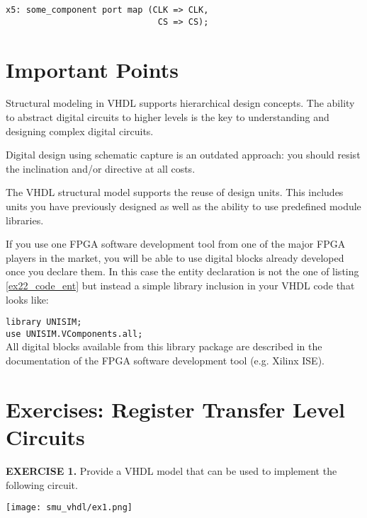 \begin{lstlisting}[label=ex22_code_same_sig, caption=An example of the same signal name crossing hierarchical boundaries.]
x5: some_component port map (CLK => CLK,
                              CS => CS); 
\end{lstlisting}

\section{Important Points}
\begin{my_list}
\item Structural modeling in VHDL supports hierarchical design concepts. The ability to abstract digital circuits to higher levels is the key to understanding and designing complex digital circuits.

\item Digital design using schematic capture is an outdated approach: you should resist the inclination and/or directive at all costs.

\item The VHDL structural model supports the reuse of design units. This includes units you have previously designed as well as the ability to use predefined module libraries.

\item If you use one FPGA software development tool from one of the major FPGA players in the market, you will be able to use digital blocks already developed once you declare them. In this case the entity declaration is not the one of listing \ref{ex22_code_ent} but instead a simple library inclusion in your VHDL code that looks like:

\hspace*{50pt}
\texttt{library UNISIM;}\\
\hspace*{50pt}
\texttt{use UNISIM.VComponents.all;}\\
All digital blocks available from this library package are described in the documentation of the FPGA software development tool (e.g. Xilinx ISE).
\end{my_list}

\section{Exercises: Register Transfer Level Circuits}

\vspace{20pt}
\noindent
\begin{minipage}[t]{0.5\textwidth}
\textbf{EXERCISE 1.}
Provide a VHDL model that can be used to implement the following circuit.
\end{minipage}
\begin{minipage}[t]{0.47\textwidth}
\vspace{0pt}\raggedright
\centering
\texttt{[image: smu\_vhdl/ex1.png]}
\end{minipage}

